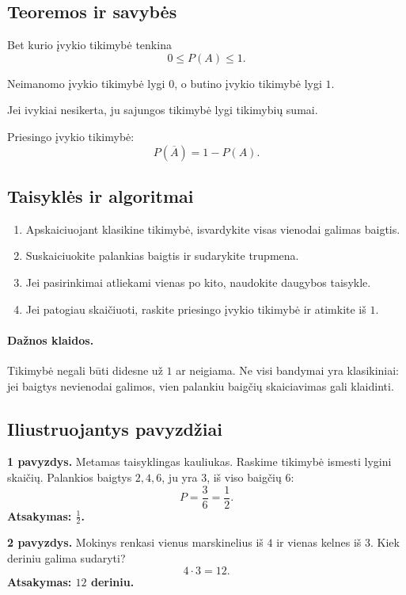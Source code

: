 \subsection{Teoremos ir savybės}
\begin{savybe}
Bet kurio įvykio tikimybė tenkina
\[
0\le P(A)\le1.
\]
\end{savybe}
\begin{savybe}
Neimanomo įvykio tikimybė lygi $0$, o butino įvykio tikimybė lygi $1$.
\end{savybe}
\begin{savybe}
Jei ivykiai nesikerta, ju sajungos tikimybė lygi tikimybių sumai.
\end{savybe}
\begin{savybe}
Priesingo įvykio tikimybė:
\[
P(\overline{A})=1-P(A).
\]
\end{savybe}

\subsection{Taisyklės ir algoritmai}
\begin{enumerate}[label=\arabic*.]
\item Apskaiciuojant klasikine tikimybė, isvardykite visas vienodai galimas baigtis.
\item Suskaiciuokite palankias baigtis ir sudarykite trupmena.
\item Jei pasirinkimai atliekami vienas po kito, naudokite daugybos taisykle.
\item Jei patogiau skaičiuoti, raskite priesingo įvykio tikimybė ir atimkite iš $1$.
\end{enumerate}
\paragraph{Dažnos klaidos.}
Tikimybė negali būti didesne už $1$ ar neigiama. Ne visi bandymai yra klasikiniai: jei baigtys nevienodai galimos, vien palankiu baigčių skaiciavimas gali klaidinti.

\subsection{Iliustruojantys pavyzdžiai}
\textbf{1 pavyzdys.} Metamas taisyklingas kauliukas. Raskime tikimybė ismesti lygini skaičių.
Palankios baigtys $2,4,6$, ju yra $3$, iš viso baigčių $6$:
\[
P=\frac36=\frac12.
\]
\textbf{Atsakymas: $\frac12$.}

\textbf{2 pavyzdys.} Mokinys renkasi vienus marskinelius iš $4$ ir vienas kelnes iš $3$. Kiek deriniu galima sudaryti?
\[
4\cdot3=12.
\]
\textbf{Atsakymas: $12$ deriniu.}

